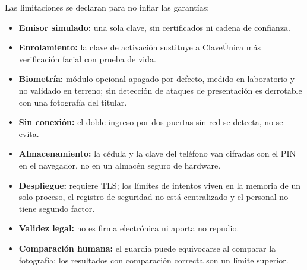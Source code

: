Las limitaciones se declaran para no inflar las garantías:
\begin{itemize}
  \item \textbf{Emisor simulado:} una sola clave, sin certificados ni cadena de confianza.
  \item \textbf{Enrolamiento:} la clave de activación sustituye a ClaveÚnica más verificación facial
        con prueba de vida.
  \item \textbf{Biometría:} módulo opcional apagado por defecto, medido en laboratorio y no validado
        en terreno; sin detección de ataques de presentación es derrotable con una fotografía del
        titular.
  \item \textbf{Sin conexión:} el doble ingreso por dos puertas sin red se detecta, no se evita.
  \item \textbf{Almacenamiento:} la cédula y la clave del teléfono van cifradas con el PIN en el
        navegador, no en un almacén seguro de hardware.
  \item \textbf{Despliegue:} requiere TLS; los límites de intentos viven en la memoria de un solo
        proceso, el registro de seguridad no está centralizado y el personal no tiene segundo factor.
  \item \textbf{Validez legal:} no es firma electrónica ni aporta no repudio.
  \item \textbf{Comparación humana:} el guardia puede equivocarse al comparar la fotografía; los
        resultados con comparación correcta son un límite superior.
\end{itemize}

